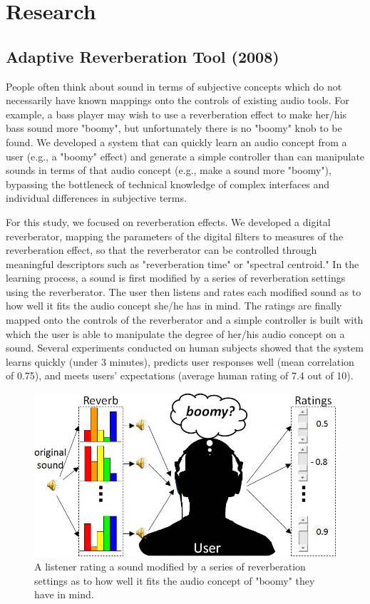 \documentclass{article}
\begin{document}
\section{Research}
\label{sec:research}

\subsection{Adaptive Reverberation Tool (2008)}
\label{ssec:reverb}

People often think about sound in terms of subjective concepts which do not necessarily have known mappings onto the controls of existing audio tools. For example, a bass player may wish to use a reverberation effect to make her/his bass sound more "boomy", but unfortunately there is no "boomy" knob to be found. We developed a system that can quickly learn an audio concept from a user (e.g., a "boomy" effect) and generate a simple controller than can manipulate sounds in terms of that audio concept (e.g., make a sound more "boomy"), bypassing the bottleneck of technical knowledge of complex interfaces and individual differences in subjective terms.

For this study, we focused on reverberation effects. We developed a digital reverberator, mapping the parameters of the digital filters to measures of the reverberation effect, so that the reverberator can be controlled through meaningful descriptors such as "reverberation time" or "spectral centroid." In the learning process, a sound is first modified by a series of reverberation settings using the reverberator. The user then listens and rates each modified sound as to how well it fits the audio concept she/he has in mind. The ratings are finally mapped onto the controls of the reverberator and a simple controller is built with which the user is able to manipulate the degree of her/his audio concept on a sound. Several experiments conducted on human subjects showed that the system learns quickly (under 3 minutes), predicts user responses well (mean correlation of 0.75), and meets users' expectations (average human rating of 7.4 out of 10).

\begin{figure}[!htb]
\centering
\includegraphics[width=\columnwidth]{Images/reverberation.jpg}
\caption{A listener rating a sound modified by a series of reverberation settings as to how well it fits the audio concept of "boomy" they have in mind.}
\label{fig:reverb}
\end{figure}
\end{document}
